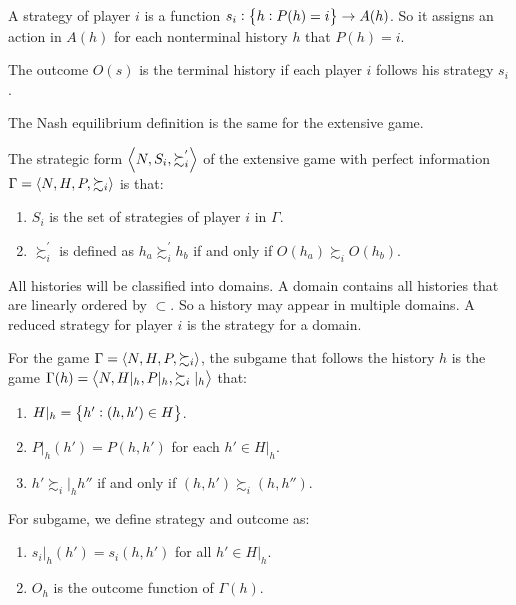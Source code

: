 \begin{definition}
    A strategy of player $i$ is a function $s_i: \set{h: P(h) = i} \rightarrow A(h)$. So it assigns an action in $A(h)$ for each nonterminal history $h$ that $P(h) = i$.
\end{definition}

\begin{definition}
    The outcome $O(s)$ is the terminal history if each player $i$ follows his strategy $s_i$.
\end{definition}

The Nash equilibrium definition is the same for the extensive game.

\begin{definition}
    The strategic form $\mleft\langle N, S_i, \succsim_i^{'} \mright\rangle$ of the extensive game with perfect information $\Gamma = \mleft\langle N, H, P, \succsim_i \mright\rangle$ is that:
    \begin{enumerate}
        \item $S_i$ is the set of strategies of player $i$ in $\Gamma$.
        \item $\succsim_i^{'}$ is defined as $h_a \succsim_i^{'} h_b$ if and only if $O(h_a) \succsim_i O(h_b)$.
    \end{enumerate}
\end{definition}

\begin{definition}
    All histories will be classified into domains. A domain contains all histories that are linearly ordered by $\subset$. So a history may appear in multiple domains. A reduced strategy for player $i$ is the strategy for a domain. 
\end{definition}

\begin{definition}
    For the game $\Gamma = \mleft\langle N, H, P, \succsim_i \mright\rangle$, the subgame that follows the history $h$ is the game $\Gamma(h) = \mleft\langle N, H|_h, P|_h, \succsim_i|_h \mright\rangle$ that:
    \begin{enumerate}
        \item $H|_h = \set{h': (h, h') \in H}$.
        \item $P|_h(h') = P(h, h')$ for each $h' \in H|_h$.
        \item $h' \succsim_i|_h h''$ if and only if $(h, h') \succsim_i (h, h'')$.
    \end{enumerate}
    
    For subgame, we define strategy and outcome as:
    \begin{enumerate}
        \item $s_i |_h(h') = s_i (h,h')$ for all $h' \in H|_h$.
        \item $O_h$ is the outcome function of $\Gamma(h)$.
    \end{enumerate}
\end{definition}

